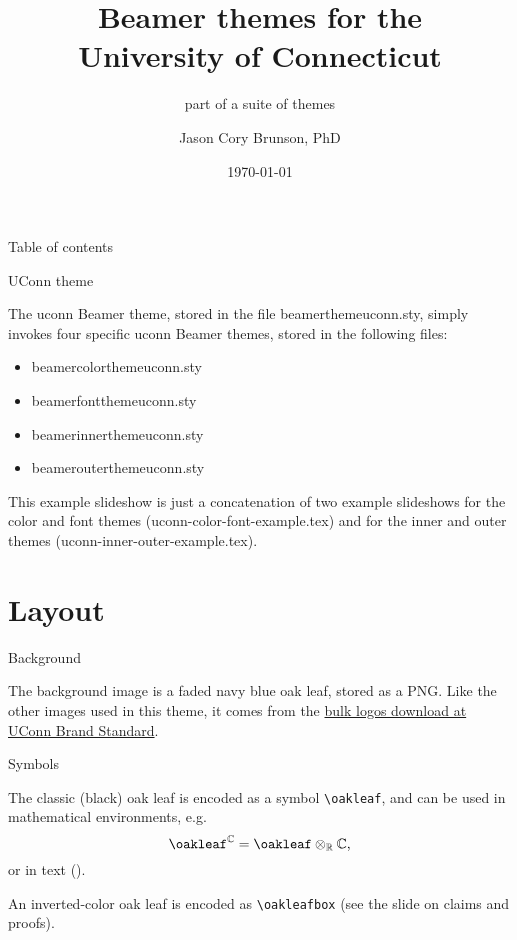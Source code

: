 \documentclass{beamer}
\title[Beamer themes for UConn]{Beamer themes for the\\ University of Connecticut}
\subtitle{part of a suite of themes}
\author[Cory Brunson]{Jason Cory Brunson, PhD}
\institute[UConn Health]{Center for Quantitative Medicine\\ University of Connecticut School of Medicine}
\date{\today}
\begin{document}
\begin{frame}
\titlepage
\end{frame}


\begin{frame}{Table of contents}
\tableofcontents
\end{frame}


\begin{frame}{UConn theme}

The {\ttfamily uconn} Beamer theme, stored in the file {\ttfamily beamerthemeuconn.sty}, simply invokes four specific {\ttfamily uconn} Beamer themes, stored in the following files:
\begin{itemize}
\ttfamily
\item beamercolorthemeuconn.sty
\item beamerfontthemeuconn.sty
\item beamerinnerthemeuconn.sty
\item beamerouterthemeuconn.sty
\end{itemize}

This example slideshow is just a concatenation of two example slideshows for the color and font themes ({\ttfamily uconn-color-font-example.tex}) and for the inner and outer themes ({\ttfamily uconn-inner-outer-example.tex}).

\end{frame}


\section{Layout}


\begin{frame}{Background}

The background image is a faded navy blue oak leaf, stored as a PNG. Like the other images used in this theme, it comes from the \href{https://brand.uconn.edu/downloads/logos/}{bulk logos download at UConn Brand Standard}.

\end{frame}


\begin{frame}[fragile]{Symbols}

The classic (black) oak leaf is encoded as a symbol \verb|\oakleaf|, and can be used in mathematical environments, e.g.
\[\oakleaf^{\mathbb{C}}=\oakleaf\otimes_{\mathbb{R}}\mathbb{C}\text,\]
or in text (\oakleaf).

An inverted-color oak leaf is encoded as \verb|\oakleafbox| (see the slide on claims and proofs).

\end{frame}
\end{document}
